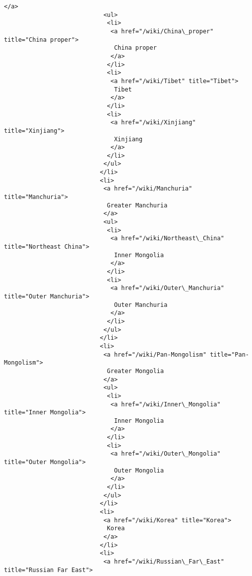 \documentclass[11pt]{article}
\begin{document}
\begin{Verbatim}[commandchars=\\\{\}]
                            </a>
                            <ul>
                             <li>
                              <a href="/wiki/China\_proper" title="China proper">
                               China proper
                              </a>
                             </li>
                             <li>
                              <a href="/wiki/Tibet" title="Tibet">
                               Tibet
                              </a>
                             </li>
                             <li>
                              <a href="/wiki/Xinjiang" title="Xinjiang">
                               Xinjiang
                              </a>
                             </li>
                            </ul>
                           </li>
                           <li>
                            <a href="/wiki/Manchuria" title="Manchuria">
                             Greater Manchuria
                            </a>
                            <ul>
                             <li>
                              <a href="/wiki/Northeast\_China" title="Northeast China">
                               Inner Mongolia
                              </a>
                             </li>
                             <li>
                              <a href="/wiki/Outer\_Manchuria" title="Outer Manchuria">
                               Outer Manchuria
                              </a>
                             </li>
                            </ul>
                           </li>
                           <li>
                            <a href="/wiki/Pan-Mongolism" title="Pan-Mongolism">
                             Greater Mongolia
                            </a>
                            <ul>
                             <li>
                              <a href="/wiki/Inner\_Mongolia" title="Inner Mongolia">
                               Inner Mongolia
                              </a>
                             </li>
                             <li>
                              <a href="/wiki/Outer\_Mongolia" title="Outer Mongolia">
                               Outer Mongolia
                              </a>
                             </li>
                            </ul>
                           </li>
                           <li>
                            <a href="/wiki/Korea" title="Korea">
                             Korea
                            </a>
                           </li>
                           <li>
                            <a href="/wiki/Russian\_Far\_East" title="Russian Far East">

\end{Verbatim}
\end{document}
